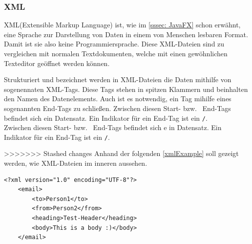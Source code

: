 \subsubsection{XML}
XML(Extensible Markup Language) ist, wie im \autoref{sssec: JavaFX} schon erwähnt, eine Sprache zur Darstellung von Daten in einem von Menschen lesbaren Format.
Damit ist sie also keine Programmiersprache.
Diese XML-Dateien sind zu vergleichen mit normalen Textdokumenten, welche mit einen gewöhnlichen Texteditor geöffnet werden können.

Strukturiert und bezeichnet werden in XML-Dateien die Daten mithilfe von sogenennaten XML-Tags.
Diese Tags stehen in spitzen Klammern und beinhalten den Namen des Datenelements.
Auch ist es notwendig, ein Tag mihilfe eines sogenannten End-Tags zu schließen.
Zwischen diesen Start- bzw. \ End-Tags befindet sich ein Datensatz.
Ein Indikator für ein End-Tag ist ein \lstinline{/}.\\
Zwischen diesen Start- bzw. \ End-Tags befindet sich e
in Datensatz.
Ein Indikator für ein End-Tag ist ein \lstinline{/}.

>>>>>>> Stashed changes
Anhand der folgenden \autoref{xmlExample} soll gezeigt werden, wie XML-Dateien im inneren aussehen.
\begin{lstlisting}[caption=XML-Codebeispiel,label=xmlExample]
<?xml version="1.0" encoding="UTF-8"?>
    <email>
        <to>Person1</to>
        <from>Person2</from>
        <heading>Test-Header</heading>
        <body>This is a body :)</body>
    </email>
\end{lstlisting}

